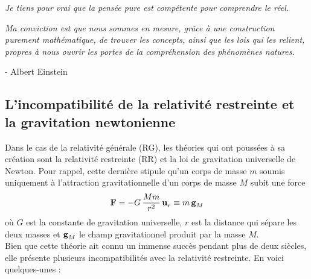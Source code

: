 \begin{center}
    \textit{Je tiens pour vrai que la pensée pure est compétente pour comprendre le réel.}
    
    \noindent \emph{Ma conviction est que nous sommes en mesure, grâce à une construction purement mathématique, de trouver les concepts, ainsi que les lois qui les relient, propres à nous ouvrir les portes de la compréhension des phénomènes natures.}
\end{center}
\begin{flushright}
    - Albert Einstein
\end{flushright}
\subsection{L'incompatibilité de la relativité restreinte et la gravitation newtonienne}
Dans le cas de la relativité générale (RG), les théories qui ont poussées à sa création sont la relativité restreinte (RR) et la loi de gravitation universelle de Newton. Pour rappel, cette dernière stipule qu'un corps de masse $m$ soumis uniquement à l'attraction gravitationnelle d'un corps de masse $M$ subit une force
\begin{equation}
    \vect{F} = -G \, \frac{M m}{r^2}\,\vect{u}\indices{_r} \deq m\,\vect{g}\indices{_M}
\end{equation}
où $G$ est la constante de gravitation universelle, $r$ est la distance qui sépare les deux masses et $\vect{g}\indices{_M}$ le champ gravitationnel produit par la masse $M$.\\
Bien que cette théorie ait connu un immense succès pendant plus de deux siècles, elle présente plusieurs incompatibilités avec la relativité restreinte. En voici quelques-unes :

